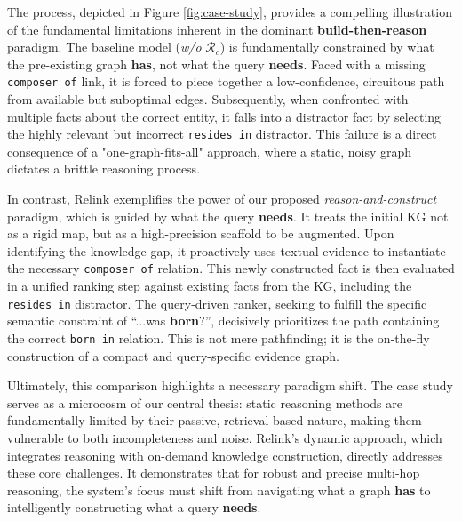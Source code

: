 \documentclass[letterpaper]{article} %
\begin{document}
The process, depicted in Figure \ref{fig:case-study}, provides a compelling illustration of the fundamental limitations inherent in the dominant \textbf{build-then-reason} paradigm. The baseline model (\textit{w/o} $\mathcal{R}_c$) is fundamentally constrained by what the pre-existing graph \textbf{has}, not what the query \textbf{needs}. Faced with a missing \texttt{composer of} link, it is forced to piece together a low-confidence, circuitous path from available but suboptimal edges. Subsequently, when confronted with multiple facts about the correct entity, it falls into a distractor fact by selecting the highly relevant but incorrect \texttt{resides in} distractor. This failure is a direct consequence of a "one-graph-fits-all" approach, where a static, noisy graph dictates a brittle reasoning process.

In contrast, Relink exemplifies the power of our proposed \textit{reason-and-construct} paradigm, which is guided by what the query \textbf{needs}. It treats the initial KG not as a rigid map, but as a high-precision scaffold to be augmented. Upon identifying the knowledge gap, it proactively uses textual evidence to instantiate the necessary \texttt{composer of} relation. This newly constructed fact is then evaluated in a unified ranking step against existing facts from the KG, including the \texttt{resides in} distractor. The query-driven ranker, seeking to fulfill the specific semantic constraint of “...was \textbf{born}?”, decisively prioritizes the path containing the correct \texttt{born in} relation. This is not mere pathfinding; it is the on-the-fly construction of a compact and query-specific evidence graph.


Ultimately, this comparison highlights a necessary paradigm shift. The case study serves as a microcosm of our central thesis: static reasoning methods are fundamentally limited by their passive, retrieval-based nature, making them vulnerable to both incompleteness and noise. Relink's dynamic approach, which integrates reasoning with on-demand knowledge construction, directly addresses these core challenges. It demonstrates that for robust and precise multi-hop reasoning, the system's focus must shift from navigating what a graph \textbf{has} to intelligently constructing what a query \textbf{needs}.

\vspace{-1.0em}
\end{document}
